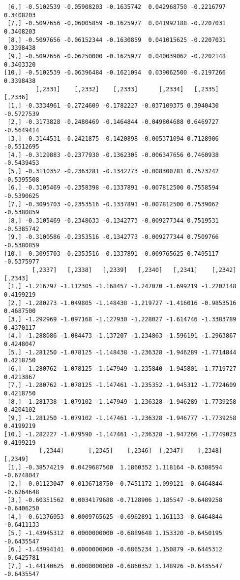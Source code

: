 \documentclass[
  letterpaper,
  DIV=11,
  numbers=noendperiod]{scrreprt}
\begin{document}
\begin{verbatim}
 [6,] -0.5102539 -0.05908203 -0.1635742  0.042968750 -0.2216797 0.3408203
 [7,] -0.5097656 -0.06005859 -0.1625977  0.041992188 -0.2207031 0.3408203
 [8,] -0.5097656 -0.06152344 -0.1630859  0.041015625 -0.2207031 0.3398438
 [9,] -0.5097656 -0.06250000 -0.1625977  0.040039062 -0.2202148 0.3403320
[10,] -0.5102539 -0.06396484 -0.1621094  0.039062500 -0.2197266 0.3398438
         [,2331]    [,2332]    [,2333]      [,2334]   [,2335]    [,2336]
 [1,] -0.3334961 -0.2724609 -0.1782227 -0.037109375 0.3940430 -0.5727539
 [2,] -0.3173828 -0.2480469 -0.1464844 -0.049804688 0.6469727 -0.5649414
 [3,] -0.3144531 -0.2421875 -0.1420898 -0.005371094 0.7128906 -0.5512695
 [4,] -0.3129883 -0.2377930 -0.1362305 -0.006347656 0.7460938 -0.5439453
 [5,] -0.3110352 -0.2363281 -0.1342773 -0.008300781 0.7573242 -0.5395508
 [6,] -0.3105469 -0.2358398 -0.1337891 -0.007812500 0.7558594 -0.5390625
 [7,] -0.3095703 -0.2353516 -0.1337891 -0.007812500 0.7539062 -0.5380859
 [8,] -0.3105469 -0.2348633 -0.1342773 -0.009277344 0.7519531 -0.5385742
 [9,] -0.3100586 -0.2353516 -0.1342773 -0.009277344 0.7509766 -0.5380859
[10,] -0.3095703 -0.2353516 -0.1337891 -0.009765625 0.7495117 -0.5375977
        [,2337]   [,2338]   [,2339]   [,2340]   [,2341]    [,2342]   [,2343]
 [1,] -1.216797 -1.112305 -1.168457 -1.247070 -1.699219 -1.2202148 0.4199219
 [2,] -1.280273 -1.049805 -1.148438 -1.219727 -1.416016 -0.9853516 0.4687500
 [3,] -1.292969 -1.097168 -1.127930 -1.228027 -1.614746 -1.3383789 0.4370117
 [4,] -1.288086 -1.084473 -1.137207 -1.234863 -1.596191 -1.2963867 0.4248047
 [5,] -1.281250 -1.078125 -1.148438 -1.236328 -1.946289 -1.7714844 0.4218750
 [6,] -1.280762 -1.078125 -1.147949 -1.235840 -1.945801 -1.7719727 0.4213867
 [7,] -1.280762 -1.078125 -1.147461 -1.235352 -1.945312 -1.7724609 0.4218750
 [8,] -1.281738 -1.079102 -1.147949 -1.236328 -1.946289 -1.7739258 0.4204102
 [9,] -1.281250 -1.079102 -1.147461 -1.236328 -1.946777 -1.7739258 0.4199219
[10,] -1.282227 -1.079590 -1.147461 -1.236328 -1.947266 -1.7749023 0.4199219
          [,2344]       [,2345]    [,2346]  [,2347]    [,2348]    [,2349]
 [1,] -0.38574219  0.0429687500  1.1860352 1.118164 -0.6308594 -0.6748047
 [2,] -0.01123047  0.0136718750 -0.7451172 1.099121 -0.6464844 -0.6264648
 [3,] -0.60351562  0.0034179688 -0.7128906 1.185547 -0.6489258 -0.6406250
 [4,] -0.61376953  0.0009765625 -0.6962891 1.161133 -0.6464844 -0.6411133
 [5,] -1.43945312  0.0000000000 -0.6889648 1.153320 -0.6450195 -0.6435547
 [6,] -1.43994141  0.0000000000 -0.6865234 1.150879 -0.6445312 -0.6425781
 [7,] -1.44140625  0.0000000000 -0.6860352 1.148926 -0.6435547 -0.6435547

\end{verbatim}
\end{document}
